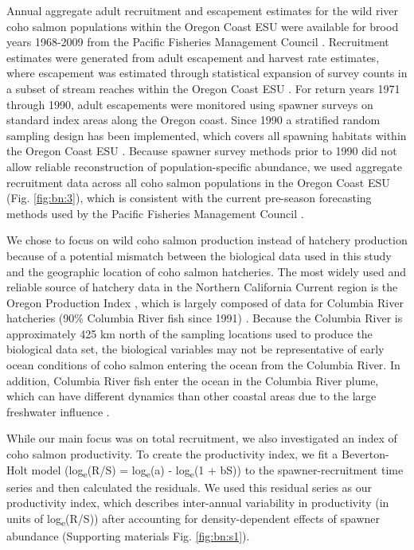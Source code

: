 Annual aggregate adult recruitment and escapement estimates for the wild river
coho salmon populations within the Oregon Coast ESU were available for brood
years 1968-2009 from the Pacific Fisheries Management Council \citep{PFMC2013,
Rupp2012}. Recruitment estimates were generated from adult escapement and
harvest rate estimates, where escapement was estimated through statistical
expansion of survey counts in a subset of stream reaches within the Oregon Coast
ESU \citep{Lewis2010}. For return years 1971 through 1990, adult escapements
were monitored using spawner surveys on standard index areas along the Oregon
coast. Since 1990 a stratified random sampling design has been implemented,
which covers all spawning habitats within the Oregon Coast ESU
\citep{Jacobs1998, Lewis2010}. Because spawner survey methods prior to 1990 did
not allow reliable reconstruction of population-specific abundance, we used
aggregate recruitment data across all coho salmon populations in the Oregon
Coast ESU (Fig. \ref{fig:bn:3}), which is consistent with the current pre-season forecasting
methods used by the Pacific Fisheries Management Council \citep{PFMC2013}.

We chose to focus on wild coho salmon production instead of hatchery production
because of a potential mismatch between the biological data used in this study
and the geographic location of coho salmon hatcheries. The most widely used and
reliable source of hatchery data in the Northern California Current region is
the Oregon Production Index \citep{Logerwell2003a, Koslow2002a, Cole2000a},
which is largely composed of data for Columbia River hatcheries (90\% Columbia
River fish since 1991) \citep{PFMC2013}. Because the Columbia River is
approximately 425 km north of the sampling locations used to produce the
biological data set, the biological variables may not be representative of early
ocean conditions of coho salmon entering the ocean from the Columbia River. In
addition, Columbia River fish enter the ocean in the Columbia River plume, which
can have different dynamics than other coastal areas due to the large freshwater
influence \citep{Hickey1998}.

While our main focus was on total recruitment, we also investigated an index of
coho salmon productivity. To create the productivity index, we fit a
Beverton-Holt model (log\textsubscript{e}(R/S) = log\textsubscript{e}(a) -
log\textsubscript{e}(1 + bS)) \citep{Beverton1957a} to the spawner-recruitment
time series and then calculated the residuals. We used this residual series as
our productivity index, which describes inter-annual variability in productivity
(in units of log\textsubscript{e}(R/S)) after accounting for density-dependent
effects of spawner abundance (Supporting materials Fig. \ref{fig:bn:s1}).


